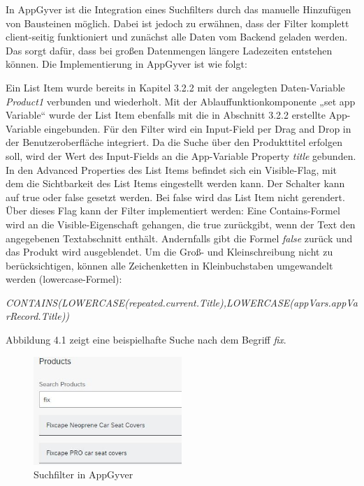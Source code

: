 In AppGyver ist die Integration eines Suchfilters durch das manuelle Hinzufügen von Bausteinen möglich. Dabei ist jedoch zu erwähnen, dass der Filter komplett client-seitig funktioniert und zunächst alle Daten vom Backend geladen werden. Das sorgt dafür, dass bei großen Datenmengen längere Ladezeiten entstehen können. Die Implementierung in AppGyver ist wie folgt:

Ein List Item wurde bereits in Kapitel 3.2.2 mit der angelegten Daten-Variable \textit{Product1} verbunden und wiederholt. Mit der Ablauffunktionkomponente „set app Variable“ wurde der List Item ebenfalls mit die in Abschnitt 3.2.2 erstellte App-Variable eingebunden. Für den Filter wird ein Input-Field per Drag and Drop in der Benutzeroberfläche integriert. Da die Suche über den Produkttitel erfolgen soll, wird der Wert des Input-Fields an die App-Variable Property \textit{title} gebunden. In den Advanced Properties des List Items befindet sich ein Visible-Flag, mit dem die Sichtbarkeit des List Items eingestellt werden kann. Der Schalter kann auf true oder false gesetzt werden. Bei false wird das List Item nicht gerendert. Über dieses Flag kann der Filter implementiert werden: Eine Contains-Formel wird an die Visible-Eigenschaft gehangen, die true zurückgibt, wenn der Text den angegebenen Textabschnitt enthält. Andernfalls gibt die Formel \textit{false} zurück und das Produkt wird ausgeblendet. Um die Groß- und Kleinschreibung nicht zu berücksichtigen, können alle Zeichenketten in Kleinbuchstaben umgewandelt werden (lowercase-Formel):

\textit{\scriptsize CONTAINS(LOWERCASE(repeated.current.Title),LOWERCASE(appVars.appVarRecord.Title))}


Abbildung 4.1 zeigt eine beispielhafte  Suche nach dem Begriff \textit{fix}.
\begin{figure}[htbp]
 \centering
 \includegraphics[width=0.5\textwidth]{Bilder/appgyver/4_1_Suchfilter_in_AppGyver.jpg}
 \caption{Suchfilter in AppGyver}
\end{figure}

